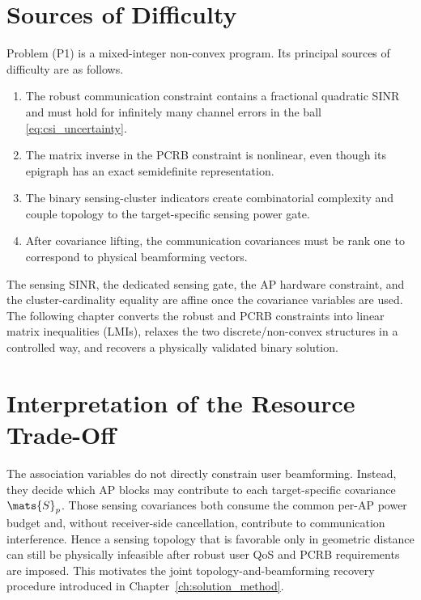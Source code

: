 \section{Sources of Difficulty}\label{sec:problem_difficulties}

Problem (P1) is a mixed-integer non-convex program.  Its principal sources of
difficulty are as follows.
\begin{enumerate}
    \item The robust communication constraint contains a fractional quadratic
    SINR and must hold for infinitely many channel errors in the ball
    \eqref{eq:csi_uncertainty}.
    \item The matrix inverse in the PCRB constraint is nonlinear, even though
    its epigraph has an exact semidefinite representation.
    \item The binary sensing-cluster indicators create combinatorial
    complexity and couple topology to the target-specific sensing power gate.
    \item After covariance lifting, the communication covariances must be
    rank one to correspond to physical beamforming vectors.
\end{enumerate}
The sensing SINR, the dedicated sensing gate, the AP hardware constraint, and
the cluster-cardinality equality are affine once the covariance variables are
used.  The following chapter converts the robust and PCRB constraints into
linear matrix inequalities (LMIs), relaxes the two discrete/non-convex
structures in a controlled way, and recovers a physically validated binary
solution.

\section{Interpretation of the Resource Trade-Off}\label{sec:resource_tradeoff}

The association variables do not directly constrain user beamforming.
Instead, they decide which AP blocks may contribute to each target-specific
covariance $\mats{S}_p$.  Those sensing covariances both consume the common
per-AP power budget and, without receiver-side cancellation, contribute to
communication interference.  Hence a sensing topology that is favorable only
in geometric distance can still be physically infeasible after robust user
QoS and PCRB requirements are imposed.  This motivates the joint
topology-and-beamforming recovery procedure introduced in
Chapter~\ref{ch:solution_method}.
